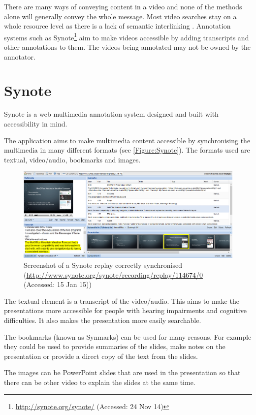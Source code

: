 There are many ways of conveying content in a video and none of the methods alone will generally convey the whole message. Most video searches stay on a whole resource level as there is a lack of semantic interlinking \citep{eps273063}. Annotation systems such as Synote\footnote{\url{http://synote.org/synote/} (Accessed: 24 Nov 14)} aim to make videos accessible by adding transcripts and other annotations to them. The videos being annotated may not be owned by the annotator.

\section{Synote}
\label{Section:Synote}
Synote is a web multimedia annotation system designed and built with accessibility in mind. 

The application aims to make multimedia content accessible by synchronising the multimedia in many different formats (see \autoref{Figure:Synote}). The formats used are textual, video/audio, bookmarks and images. 

\begin{figure}[h!]
	\centering 
		\includegraphics[scale=0.4]{../figures/synote_sync.png} 		
	\caption{\label{Figure:Synote} Screenshot of a Synote replay correctly synchronised (\url{http://www.synote.org/synote/recording/replay/114674/0} (Accessed: 15 Jan 15))}
\end{figure}

The textual element is a transcript of the video/audio. This aims to make the presentations more accessible for people with hearing impairments and cognitive difficulties. It also makes the presentation more easily searchable.

The bookmarks (known as Synmarks) can be used for many reasons. For example they could be used to provide summaries of the slides, make notes on the presentation or provide a direct copy of the text from the slides.

The images can be PowerPoint slides that are used in the presentation so that there can be other video to explain the slides at the same time.

